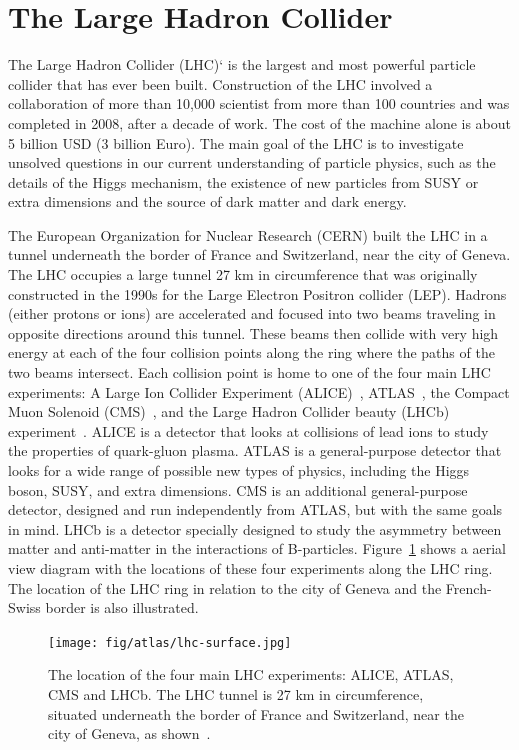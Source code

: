 \section{The Large Hadron Collider}
The Large Hadron Collider (LHC)`\cite{cern-faq} is the largest and most powerful particle collider that has ever been built. Construction of the LHC involved a collaboration of more than 10,000 scientist from more than 100 countries and was completed in 2008, after a decade of work. The cost of the machine alone is about 5 billion USD (3 billion Euro). The main goal of the LHC is to investigate unsolved questions in our current understanding of particle physics, such as the details of the Higgs mechanism, the existence of new particles from SUSY or extra dimensions and the source of dark matter and dark energy.

The European Organization for Nuclear Research (CERN) built the LHC in a tunnel underneath the border of France and Switzerland, near the city of Geneva. The LHC occupies a large tunnel 27 km in circumference that was originally constructed in the 1990s for the Large Electron Positron collider (LEP). Hadrons (either protons or ions) are accelerated and focused into two beams traveling in opposite directions around this tunnel. These beams then collide with very high energy at each of the four collision points along the ring where the paths of the two beams intersect. Each collision point is home to one of the four main LHC experiments: A Large Ion Collider
Experiment (ALICE)~\cite{cern-jinst-alice}, ATLAS~\cite{cern-jinst-atlas}, the Compact Muon Solenoid (CMS)~\cite{cern-jinst-cms}, and the Large Hadron Collider beauty (LHCb) experiment~\cite{cern-jinst-lhcb}. ALICE is a detector that looks at collisions of lead ions to study the properties of quark-gluon plasma. ATLAS is a general-purpose detector that looks for a wide range of possible new types of physics, including the Higgs boson, SUSY, and extra dimensions. CMS is an additional general-purpose detector, designed and run independently from ATLAS, but with the same goals in mind. LHCb is a detector specially designed to study the asymmetry between matter and anti-matter in the interactions of B-particles. Figure~\ref{fig:lhc-exp} shows a aerial view diagram with the locations of these four experiments along the LHC ring. The location of the LHC ring in relation to the city of Geneva and the French-Swiss border is also illustrated.

\begin{figure}[tp]
  \centering
  \texttt{[image: fig/atlas/lhc-surface.jpg]}
  \caption{The location of the four main LHC experiments: ALICE, ATLAS, CMS and LHCb. The LHC tunnel is 27 km in circumference, situated underneath the border of France and Switzerland, near the city of Geneva, as shown~\cite{atlas-surface}.}
  \label{fig:lhc-exp}
\end{figure}


